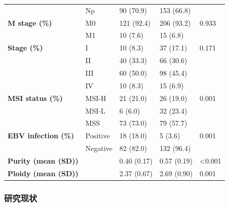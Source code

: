 \begin{table}[htbp]
\begin{tabular}{lllll}
            & Np    & 90 (70.9) & 153 (66.8) &  \\
    \textbf{M stage (\%)} & M0    & 121 (92.4) & 206 (93.2) & 0.933 \\
            & M1    & 10 (7.6) & 15 (6.8) &  \\
    \textbf{Stage (\%)} & I     & 10 (8.3) & 37 (17.1) & 0.171 \\
            & II    & 40 (33.3) & 66 (30.6) &  \\
            & III   & 60 (50.0) & 98 (45.4) &  \\
            & IV    & 10 (8.3) & 15 (6.9) &  \\
    \textbf{MSI status (\%)} & MSI-H & 21 (21.0) & 26 (19.0) & 0.001 \\
            & MSI-L & 6 (6.0) & 32 (23.4) &  \\
            & MSS   & 73 (73.0) & 79 (57.7) &  \\
    \textbf{EBV infection (\%)} & Positive & 18 (18.0) & 5 (3.6) & 0.001 \\
            & Negative & 82 (82.0) & 132 (96.4) &  \\
    \textbf{Purity (mean (SD))} &       & 0.40 (0.17) & 0.57 (0.19) & <0.001 \\
    \textbf{Ploidy (mean (SD))} &       & 2.37 (0.67) & 2.69 (0.90) & 0.001 \\
    \bottomrule
    \end{tabular}%
    \label{table1}%
\end{table}%

\clearpage

\subsubsection{研究现状}

